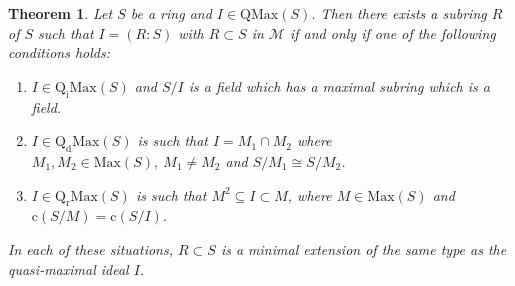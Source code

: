 \documentclass[12pt,leqno]{amsart}
\newtheorem{theorem}{Theorem}[section]
\theoremstyle{definition}
\begin{document}
\begin{theorem}\label{4.15} Let $S$ be a ring and $I\in\mathrm{QMax}(S)$. Then there exists a subring $R$ of $S$ such that $I=(R:S)$ with $R\subset S$ in $\mathcal M$ if and only if one of the following conditions holds:
\begin{enumerate}
\item $I\in\mathrm{Q_iMax}(S)$ and $S/I$ is a field which has a maximal subring which is a field.
\item $I\in\mathrm{Q_dMax}(S)$ is such that $I=M_1\cap M_2$ where $ M_1,M_2\in\mathrm{Max}(S),\ M_1\neq M_2$ and $S/M_1\cong S/M_2$.
 \item $I\in\mathrm{Q_rMax}(S)$ is such that $M^2\subseteq I\subset M$, where $M\in\mathrm{Max}(S)$  and  $\mathrm{c}(S/M)=\mathrm{c}(S/I)$.
\end{enumerate}
In each of these situations, $R\subset S$ is a minimal extension of the same type as  the quasi-maximal ideal $I$. 
\end{theorem}
\end{document}
